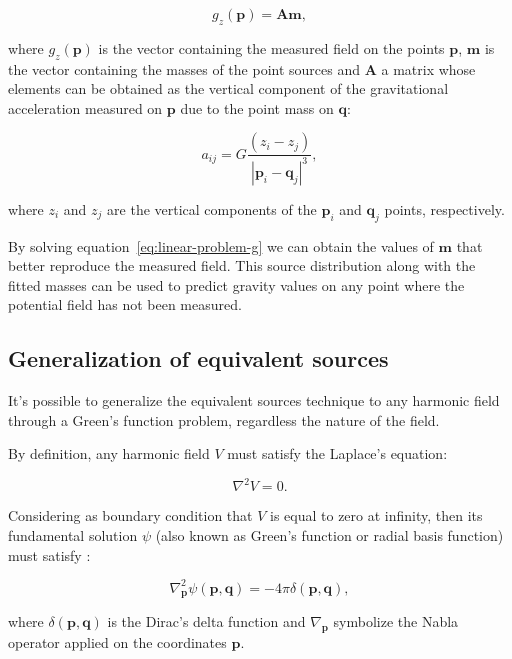 \documentclass[twocolumn]{article}
\begin{document}
\begin{equation}
    g_z(\mathbf{p}) = \mathbf{A} \mathbf{m},
    \label{eq:linear-problem-g}
\end{equation}

\noindent where $g_z(\mathbf{p})$ is the vector containing the measured
field on the points $\mathbf{p}$, $\mathbf{m}$ is the vector containing the
masses of the point sources and $\mathbf{A}$ a matrix whose
elements can be obtained as the vertical component of the gravitational
acceleration measured on $\mathbf{p}$ due to the point mass on $\mathbf{q}$:

\begin{equation}
    a_{ij} = G \frac{(z_i - z_j)}{|\mathbf{p}_i - \mathbf{q}_j|^3},
\end{equation}

\noindent where $z_i$ and $z_j$ are the vertical components of the
$\mathbf{p}_i$ and $\mathbf{q}_j$ points, respectively.

By solving equation~\ref{eq:linear-problem-g} we can obtain the values of
$\mathbf{m}$ that better reproduce the measured field.
This source distribution along with the fitted masses can be used to predict
gravity values on any point where the potential field has not been measured.


\subsection{Generalization of equivalent sources}

It's possible to generalize the equivalent sources technique to any harmonic
field through a Green's function problem, regardless the nature of the field.

By definition, any harmonic field $V$ must satisfy the Laplace's equation:

\begin{equation}
    \nabla^2 V = 0.
\end{equation}

Considering as boundary condition that $V$ is equal to zero at infinity, then
its fundamental solution $\psi$ (also known as Green's function or radial basis
function) must satisfy \citep[p.~210]{vladimirov1979}:

\begin{equation}
    \nabla_\mathbf{p}^2 \psi(\mathbf{p}, \mathbf{q}) =
        - 4\pi \delta(\mathbf{p}, \mathbf{q}),
\end{equation}

\noindent where $\delta(\mathbf{p}, \mathbf{q})$ is the Dirac's delta function
and $\nabla_\mathbf{p}$ symbolize the Nabla operator applied on the coordinates
$\mathbf{p}$.
\end{document}
